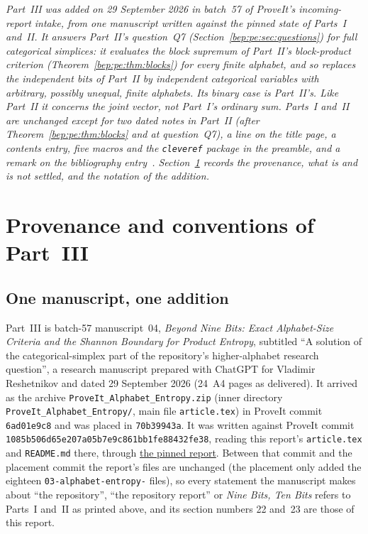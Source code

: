 \documentclass[11pt]{article}
\numberwithin{equation}{section}
\theoremstyle{definition}
\theoremstyle{remark}
\begin{document}
\noindent\emph{Part~III was added on 29 September 2026 in batch~57 of
ProveIt's incoming-report intake, from one manuscript written against
the pinned state of Parts~I and~II. It answers Part~II's question~Q7
(Section~\ref{bep:pe:sec:questions}) for full categorical simplices: it
evaluates the block supremum of Part~II's block-product criterion
(Theorem~\ref{bep:pe:thm:blocks}) for every finite alphabet, and so
replaces the independent \emph{bits} of Part~II by independent
categorical variables with arbitrary, possibly unequal, finite alphabets.
Its binary case is Part~II's. Like Part~II it concerns the joint vector,
not Part~I's ordinary sum. Parts~I and~II are unchanged except for two
dated notes in Part~II (after Theorem~\ref{bep:pe:thm:blocks} and at
question~Q7), a line on the title page, a contents entry, five macros and
the \texttt{cleveref} package in the preamble, and a remark on the
bibliography entry~\cite{bep:pe:Wang}. Section~\ref{bep:ae:sec:front}
records the provenance, what is and is not settled, and the notation of
the addition.}

\section{Provenance and conventions of Part~III}\label{bep:ae:sec:front}

\subsection{One manuscript, one addition}\label{bep:ae:sec:source}
Part~III is batch-57 manuscript~04, \emph{Beyond Nine Bits: Exact
Alphabet-Size Criteria and the Shannon Boundary for Product Entropy},
subtitled ``A solution of the categorical-simplex part of the
repository's higher-alphabet research question'', a research manuscript
prepared with ChatGPT for Vladimir Reshetnikov and dated 29 September
2026 (24~A4 pages as delivered). It arrived as the archive
\nolinkurl{ProveIt_Alphabet_Entropy.zip} (inner directory
\nolinkurl{ProveIt_Alphabet_Entropy/}, main file \nolinkurl{article.tex})
in ProveIt commit \texttt{6ad01e9c8} and was placed in
\texttt{70b39943a}. It was written against ProveIt commit
\texttt{1085b506d65e207a05b7e9c861bb1fe88432fe38}, reading this report's
\nolinkurl{article.tex} and \nolinkurl{README.md} there, through
\href{https://github.com/VladimirReshetnikov/ProveIt/tree/1085b506d65e207a05b7e9c861bb1fe88432fe38/SetTheory/Cardinals/docs/reports/log-concavity-and-unimodality/bernoulli-entropy-quasiconcavity}{the
pinned report}. Between that commit and the placement commit the
report's files are unchanged (the placement only added the eighteen
\texttt{03-alphabet-entropy-} files), so every statement the manuscript
makes about ``the repository'', ``the repository report'' or
\emph{Nine Bits, Ten Bits} refers to Parts~I and~II as printed above,
and its section numbers 22 and~23 are those of this report.
\end{document}
